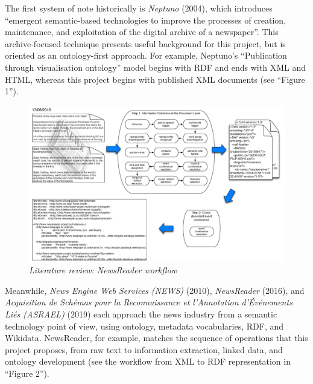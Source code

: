\documentclass[11pt]{article}
\begin{document}
  The first system of note historically is \textit{Neptuno} (2004)\cite{castells2004neptuno}, which introduces ``emergent semantic-based technologies to improve the processes of creation, maintenance, and exploitation of the digital archive of a newspaper''. This archive-focused technique presents useful background for this project, but is oriented as an ontology-first approach. For example, Neptuno's ``Publication through visualisation ontology'' model begins with RDF and ends with XML and HTML, whereas this project begins with published XML documents (see ``Figure 1'').

  \begin{figure}
    \centerline{\includegraphics[scale=0.4]{literature-review--newsreader.png}}
    \caption{\textit{Literature review: NewsReader workflow}}
  \end{figure}

  Meanwhile, \textit{News Engine Web Services (NEWS)} \cite{fernandez2010news} (2010), \textit{NewsReader} \cite{vossen2016newsreader} (2016), and \textit{Acquisition de Schémas pour la Reconnaissance et l'Annotation d'Événements Liés (ASRAEL)} \cite{rudnik2019searching} (2019) each approach the news industry from a semantic technology point of view, using ontology, metadata vocabularies, RDF, and Wikidata. NewsReader, for example, matches the sequence of operations that this project proposes, from raw text to information extraction, linked data, and ontology development (see the workflow from XML to RDF representation in ``Figure 2'').
\end{document}

